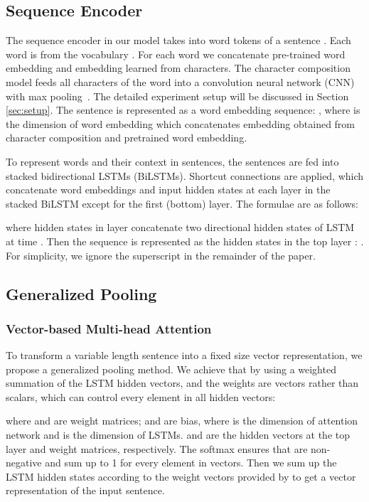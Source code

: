 \documentclass[11pt]{article}
\begin{document}
\subsection{Sequence Encoder}


The sequence encoder in our model takes into  word tokens of a sentence . Each word  is from the vocabulary . For each word we concatenate pre-trained word embedding and embedding learned from characters. The character composition model feeds all characters of the word into a convolution neural network (CNN) with max pooling~\cite{DBLP:conf/emnlp/Kim14}. The detailed experiment setup will be discussed in Section \ref{sec:setup}. The sentence  is represented as a word embedding sequence: , where  is the dimension of word embedding which concatenates embedding obtained from character composition and pretrained word embedding.

To represent words and their context in sentences, the sentences are fed into stacked bidirectional LSTMs (BiLSTMs). Shortcut connections are applied, which concatenate word embeddings and input hidden states at each layer in the stacked BiLSTM except for the first (bottom) layer. The formulae are as follows:



\noindent where hidden states  in layer  concatenate two directional hidden states of LSTM at time .
Then the sequence is represented as the hidden states in the top layer : . For simplicity, we ignore the superscript  in the remainder of the paper.

\subsection{Generalized Pooling}
\subsubsection{Vector-based Multi-head Attention} 
To transform a variable length sentence into a fixed size vector representation, we propose a generalized pooling method. We achieve that by using a weighted summation of the  LSTM hidden vectors, and the weights are vectors rather than scalars, which can control every element in all hidden vectors: 


\noindent where  and  are weight matrices;  and  are bias, where  is the dimension of attention network and  is the dimension of LSTMs.  and  are the hidden vectors at the top layer and weight matrices, respectively. The softmax ensures that  are non-negative and sum up to 1 for every element in vectors. Then we sum up the LSTM hidden states  according to the weight vectors provided by  to get a vector representation  of the input sentence.
\end{document}
